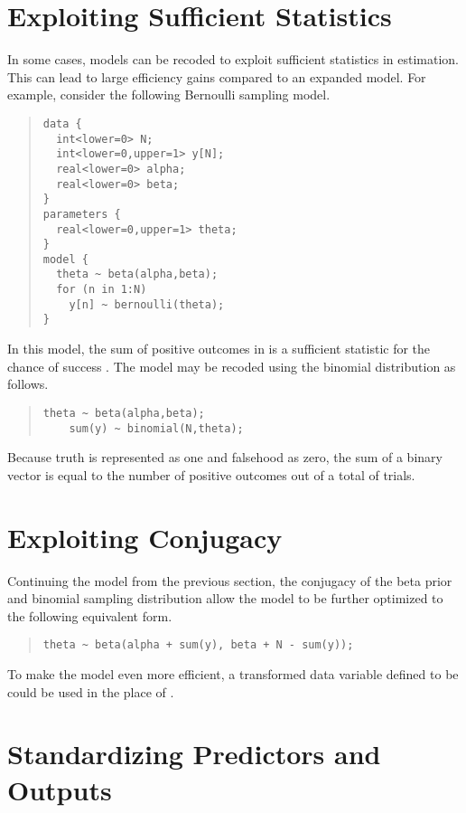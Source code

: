 \section{Exploiting Sufficient Statistics}

In some cases, models can be recoded to exploit sufficient statistics
in estimation.  This can lead to large efficiency gains compared to an
expanded model.  For example, consider the following Bernoulli
sampling model.
%
\begin{quote}
\begin{Verbatim}[fontsize=\small]
data {
  int<lower=0> N;
  int<lower=0,upper=1> y[N];
  real<lower=0> alpha;
  real<lower=0> beta;
}
parameters {
  real<lower=0,upper=1> theta;
}
model {
  theta ~ beta(alpha,beta);
  for (n in 1:N) 
    y[n] ~ bernoulli(theta);
}
\end{Verbatim}
\end{quote}
%
In this model, the sum of positive outcomes in  is a
sufficient statistic for the chance of success .  The
model may be recoded using the binomial distribution as follows.
%
\begin{quote}
\begin{Verbatim}[fontsize=\small]
    theta ~ beta(alpha,beta);
    sum(y) ~ binomial(N,theta);
\end{Verbatim}
\end{quote}
%
Because truth is represented as one and falsehood as zero, the sum
 of a binary vector  is equal to the number of
positive outcomes out of a total of  trials.  



\section{Exploiting Conjugacy}


Continuing the model from the previous section, the conjugacy of the
beta prior and binomial sampling distribution allow the model to be
further optimized to the following equivalent form.
%
\begin{quote}
\begin{Verbatim}[fontsize=\small]
    theta ~ beta(alpha + sum(y), beta + N - sum(y));
\end{Verbatim}
\end{quote}
%
To make the model even more efficient, a transformed data variable
defined to be  could be used in the place of .

\section{Standardizing Predictors and Outputs}

